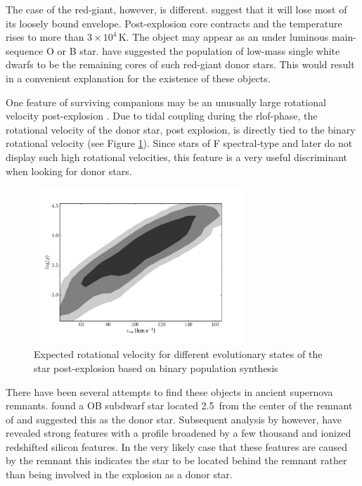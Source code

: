 The case of the red-giant, however, is different. \citet{2000ApJS..128..615M} suggest that it will lose most of its loosely bound envelope. Post-explosion core contracts and the temperature rises to more than $3 \times 10^4$\,K. The object may appear as an under luminous main-sequence O or B star. \cite{2009A&A...493.1081J} have suggested the population of low-mass single white dwarfs to be the remaining cores of such red-giant donor stars. This would result in a convenient explanation for the existence of these objects. 

One feature of surviving companions may be an unusually large rotational velocity post-explosion \citep[][Chapter \ref{chap:sn1572_starg} of this work]{2009ApJ...701.1665K}. Due to tidal coupling during the \gls{rlof}-phase, the rotational velocity  of the donor star, post explosion, is directly tied to the binary rotational velocity (see Figure \ref{fig:han2008_vrot}). Since stars of F spectral-type and later do not display such high rotational velocities, this feature is a very useful discriminant when looking for donor stars. 

\begin{figure}[htbp] %
   \centering
   \includegraphics[width=0.7\textwidth]{chapter_intro/plots/theo_vrot.pdf} 
   \caption[Expected rotational velocities of donor stars]{Expected rotational velocity for different evolutionary states of the  star post-explosion based on binary population synthesis \citep[][data kindly provided by Z. Han]{2008ApJ...677L.109H} }
   \label{fig:han2008_vrot}
\end{figure}


There have been several attempts to find these objects in ancient supernova remnants. \citet{1980ApJ...241.1039S} found a OB subdwarf star located 2.5\arcmin\ from the center of the remnant of  and suggested this as the donor star. Subsequent analysis by \cite{1997ApJ...477L..53W, 1983ApJ...269L...5W} however, have revealed strong  features with a profile broadened by a few thousand \kms and ionized redshifted silicon features. In the very likely case that these features are caused by the remnant this indicates the star to be located behind the remnant rather than being involved in the \snia explosion as a donor star.
 
